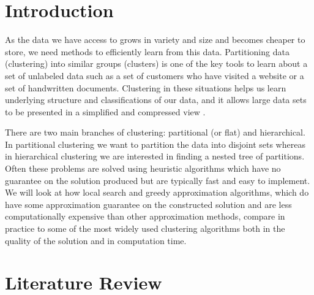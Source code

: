 \documentclass{article}
\begin{document}
 



\section{Introduction}
As the data we have access to grows in variety and size and becomes cheaper to store, we need methods to efficiently learn from this data. 
Partitioning data (clustering) into similar groups (clusters) is one of the key tools to learn about a set of unlabeled data such as a set of customers who have visited a website or a set of handwritten documents.
Clustering in these situations helps us learn underlying structure and classifications of our data, and it allows large data sets to be presented in a simplified and compressed view \cite{Jain}.

There are two main branches of clustering: partitional (or flat) and hierarchical. In partitional clustering we want to partition the data into disjoint sets whereas in hierarchical clustering we are interested in finding a nested tree of partitions. Often these problems are solved using heuristic algorithms which have no guarantee on the solution produced but are typically fast and easy to implement. We will look at how local search and greedy approximation algorithms, which do have some approximation guarantee on the constructed solution and are less computationally expensive than other approximation methods, compare in practice to some of the most widely used clustering algorithms both in the quality of the solution and in computation time. 

\section{Literature Review}
\end{document}
